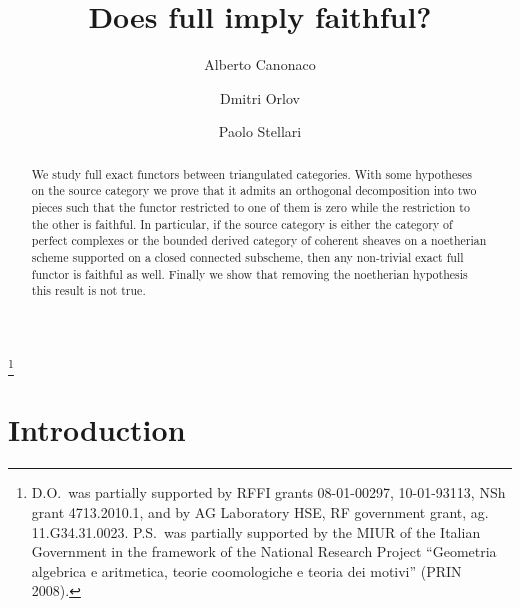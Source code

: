 \documentclass[a4paper,11pt,twoside]{amsart}
\numberwithin{equation}{section}
\theoremstyle{definition}
\begin{document}
	\title[Does full imply faithful?]{Does full imply faithful?}

    \author{Alberto Canonaco}
    \author{Dmitri Orlov}
    \author{Paolo Stellari}

	\address{A.C.: Dipartimento di Matematica ``F. Casorati'', Universit{\`a}
	degli Studi di Pavia, Via Ferrata 1, 27100 Pavia, Italy}

	\address{D.O.: Algebra Section, Steklov Mathematical Institute RAS, 8 Gubkin Str., Moscow 119991, Russia}

	\address{P.S.: Dipartimento di Matematica ``F.
	Enriques'', Universit{\`a} degli Studi di Milano, Via Cesare Saldini
	50, 20133 Milano, Italy}


	\thanks{D.O.\ was partially supported by  RFFI grants
	08-01-00297, 10-01-93113,  NSh grant 4713.2010.1, and
	by AG Laboratory HSE, RF government
	grant, ag. 11.G34.31.0023. P.S.\ was partially supported by the
	MIUR of the Italian Government in the framework of the National Research Project ``Geometria algebrica e aritmetica, teorie coomologiche e teoria dei motivi'' (PRIN 2008).}

	
\begin{abstract}
We study full exact functors between triangulated categories. With some hypotheses on the source category we prove that it admits an orthogonal decomposition into two pieces such that the functor restricted to one of them is zero while the restriction to the other is faithful. In particular, if the source category is either the category of perfect complexes or the bounded derived category of coherent sheaves on a noetherian scheme supported on a closed connected subscheme, then any non-trivial exact full functor is faithful as well. Finally we show that removing the noetherian hypothesis this result is not true.
\end{abstract}

\maketitle

\section{Introduction}\label{Intro}
\end{document}
